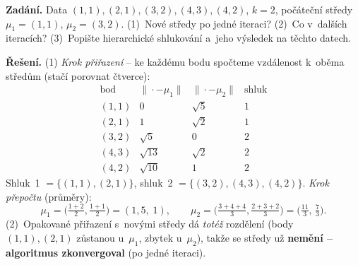 \begin{priklad}
\par
\textbf{Zadání.} Data $(1,1),(2,1),(3,2),(4,3),(4,2)$, $k=2$, počáteční středy $\mu_1=(1,1)$, $\mu_2=(3,2)$. (1)~Nové středy po jedné iteraci? (2)~Co v~dalších iteracích? (3)~Popište hierarchické shlukování a~jeho výsledek na těchto datech.

\smallskip
\textbf{Řešení.} (1) \emph{Krok přiřazení} -- ke každému bodu spočteme vzdálenost k~oběma středům (stačí porovnat čtverce):
\[
\begin{array}{c|cc|c}
\text{bod} & \|{\cdot}-\mu_1\| & \|{\cdot}-\mu_2\| & \text{shluk}\\\hline
(1,1) & 0 & \sqrt5 & 1\\
(2,1) & 1 & \sqrt2 & 1\\
(3,2) & \sqrt5 & 0 & 2\\
(4,3) & \sqrt{13} & \sqrt2 & 2\\
(4,2) & \sqrt{10} & 1 & 2
\end{array}
\]
Shluk~1 $=\{(1,1),(2,1)\}$, shluk~2 $=\{(3,2),(4,3),(4,2)\}$. \emph{Krok přepočtu} (průměry):
\[
  \mu_1=\Big(\tfrac{1+2}{2},\tfrac{1+1}{2}\Big)=\boxed{(1{,}5,\;1)},\qquad
  \mu_2=\Big(\tfrac{3+4+4}{3},\tfrac{2+3+2}{3}\Big)=\boxed{\big(\tfrac{11}{3},\,\tfrac{7}{3}\big)}.
\]
(2)~Opakované přiřazení s~novými středy dá \emph{totéž} rozdělení (body $(1,1),(2,1)$ zůstanou u~$\mu_1$, zbytek u~$\mu_2$), takže se středy už \textbf{nemění -- algoritmus zkonvergoval} (po jedné iteraci).


\end{priklad}
